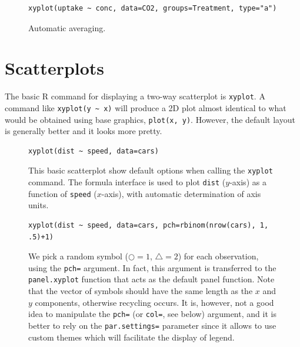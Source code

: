\documentclass[a4paper,twoside]{book}
\newcounter{fig}
\newcommand{\img}[1]{\texttt{[image: \#1]}\stepcounter{fig}}
\renewcommand{\texttt}[1]{\lstinline{#1}}
\newcommand{\R}{\textsf{R}\xspace}
\begin{document}
\begin{figure}[H]
\begin{lstlisting}
xyplot(uptake ~ conc, data=CO2, groups=Treatment, type="a")
\end{lstlisting}
  \fcapside[\FBwidth] {\img{figs_lattice-crop}}
  {\caption*{Automatic averaging.}}
\end{figure}




\section{Scatterplots}\label{sec:scatterplot}
The basic \R command for displaying a two-way scatterplot is
\texttt{xyplot}. A command like \texttt{xyplot(y ~ x)} will produce a
2D plot almost identical to what would be obtained using base
graphics, \texttt{plot(x, y)}. However, the default layout is
generally better and it looks more pretty.

\begin{figure}[H]
\begin{lstlisting}
xyplot(dist ~ speed, data=cars)
\end{lstlisting}
  \fcapside[\FBwidth] {\img{figs_lattice-crop}}
  {\caption*{This basic scatterplot show default
      options when calling the \texttt{xyplot} command. The formula
      interface is used to plot \texttt{dist} ($y$-axis) as a function
      of \texttt{speed} ($x$-axis), with automatic determination of
      axis units.}}
\end{figure}



\begin{figure}[H]
\begin{lstlisting}
xyplot(dist ~ speed, data=cars, pch=rbinom(nrow(cars), 1, .5)+1)
\end{lstlisting}
  \fcapside[\FBwidth] {\img{figs_lattice-crop}} {\caption*{We pick a
      random symbol (${\scriptstyle\Circle}=1$,
      ${\scriptstyle\triangle}=2$) for each observation, using the
      \texttt{pch=} argument. In fact, this argument is transferred to
      the \texttt{panel.xyplot} function that acts as the default
      panel function. Note that the vector of symbols should have the
      same length as the $x$ and $y$ components, otherwise recycling
      occurs. It is, however, not a good idea to manipulate the
      \texttt{pch=} (or \texttt{col=}, see below) argument, and it is better
    to rely on the \texttt{par.settings=} parameter since it allows to use
    custom themes which will facilitate the display of legend.}}
\end{figure}
\end{document}
